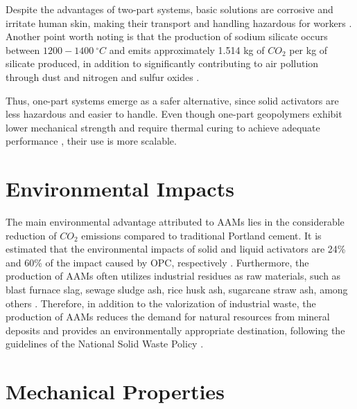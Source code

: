 Despite the advantages of two-part systems, basic solutions are corrosive and irritate human skin, making their transport and handling hazardous for workers \cite{awoyera2019critical}.
Another point worth noting is that the production of sodium silicate occurs between $1200-1400\ ^\circ C$ and emits approximately 1.514 kg of $CO_2$ per kg of silicate produced, in addition to significantly contributing to air pollution through dust and nitrogen and sulfur oxides \cite{rajan2020sustainable}.


Thus, one-part systems emerge as a safer alternative, since solid activators are less hazardous and easier to handle. Even though one-part geopolymers exhibit lower mechanical strength and require thermal curing to achieve adequate performance \cite{provis2018alkali}, their use is more scalable.

\section{Environmental Impacts}

The main environmental advantage attributed to AAMs lies in the considerable reduction of $CO_2$ emissions compared to traditional Portland cement.
It is estimated that the environmental impacts of solid and liquid activators are 24\% and 60\% of the impact caused by OPC, respectively \cite{luukkonen2017review}.
Furthermore, the production of AAMs often utilizes industrial residues as raw materials, such as blast furnace slag, sewage sludge ash, rice husk ash, sugarcane straw ash, among others \cite{moraes2024scsa}.
Therefore, in addition to the valorization of industrial waste, the production of AAMs reduces the demand for natural resources from mineral deposits and provides an environmentally appropriate destination, following the guidelines of the National Solid Waste Policy \cite{PNRS2016}.

\section{Mechanical Properties}

